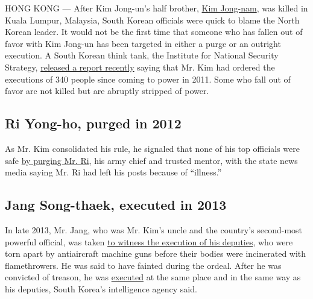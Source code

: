 HONG KONG --- After Kim Jong-un's half brother,
\href{https://www.nytimes3xbfgragh.onion/2017/02/14/world/asia/kim-jong-un-brother-killed-malaysia.html?ref=asia}{Kim
Jong-nam}, was killed in Kuala Lumpur, Malaysia, South Korean officials
were quick to blame the North Korean leader. It would not be the first
time that someone who has fallen out of favor with Kim Jong-un has been
targeted in either a purge or an outright execution. A South Korean
think tank, the Institute for National Security Strategy,
\href{http://www.cnn.com/2016/12/29/asia/kim-jong-un-executions/}{released
a report recently} saying that Mr. Kim had ordered the executions of 340
people since coming to power in 2011. Some who fall out of favor are not
killed but are abruptly stripped of power.

\hypertarget{ri-yong-ho-purged-in-2012}{%
\subsection{\texorpdfstring{\textbf{Ri Yong-ho, purged in
2012}}{Ri Yong-ho, purged in 2012}}\label{ri-yong-ho-purged-in-2012}}

As Mr. Kim consolidated his rule, he signaled that none of his top
officials were safe
\href{http://www.nytimes3xbfgragh.onion/2012/07/17/world/asia/north-korea-removes-its-army-chief-from-all-his-posts.html}{by
purging Mr. Ri}, his army chief and trusted mentor, with the state news
media saying Mr. Ri had left his posts because of ``illness.''

\hypertarget{jang-song-thaek-executed-in-2013}{%
\subsection{\texorpdfstring{\textbf{Jang Song-thaek, executed in
2013}}{Jang Song-thaek, executed in 2013}}\label{jang-song-thaek-executed-in-2013}}

In late 2013, Mr. Jang, who was Mr. Kim's uncle and the country's
second-most powerful official, was taken
\href{https://www.nytimes3xbfgragh.onion/2016/03/13/world/asia/north-korea-executions-jang-song-thaek.html}{to
witness the execution of his deputies}, who were torn apart by
antiaircraft machine guns before their bodies were incinerated with
flamethrowers. He was said to have fainted during the ordeal. After he
was convicted of treason, he was
\href{http://www.nytimes3xbfgragh.onion/2013/12/13/world/asia/north-korea-says-uncle-of-executed.html?_r=0}{executed}
at the same place and in the same way as his deputies, South Korea's
intelligence agency said.

